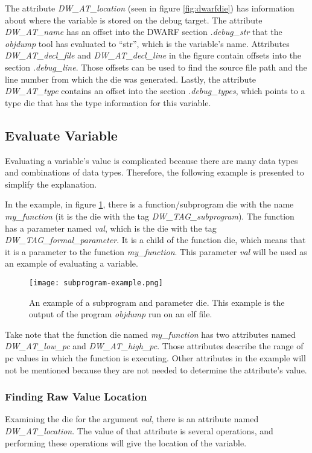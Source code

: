 The attribute \emph{DW\_AT\_location} (seen in figure \ref{fig:dwarfdie}) has information about where the variable is stored on the debug target.
The attribute \emph{DW\_AT\_name} has an offset into the \gls{DWARF} section \emph{.debug\_str} that the \emph{objdump} tool has evaluated to ``str'', which is the variable's name.
Attributes \emph{DW\_AT\_decl\_file} and \emph{DW\_AT\_decl\_line} in the figure contain offsets into the section \emph{.debug\_line}.
Those offsets can be used to find the source file path and the line number from which the \gls{die} was generated.
Lastly, the attribute \emph{DW\_AT\_type} contains an offset into the section \emph{.debug\_types}, which points to a type \gls{die} that has the type information for this variable.


\subsection{Evaluate Variable}
\label{sec:evaluate-variable}
Evaluating a variable's value is complicated because there are many data types and combinations of data types.
Therefore, the following example is presented to simplify the explanation.


In the example, in figure \ref{fig:subprogramexample}, there is a function/subprogram \gls{die} with the name \emph{my\_function} (it is the \gls{die} with the tag \emph{DW\_TAG\_subprogram}).
The function has a parameter named \emph{val}, which is the \gls{die} with the tag \emph{DW\_TAG\_formal\_parameter}.
It is a child of the function \gls{die}, which means that it is a parameter to the function \emph{my\_function}.
This parameter \emph{val} will be used as an example of evaluating a variable.


\begin{figure}[h]
	\centering
	\texttt{[image: subprogram-example.png]}
	\caption{An example of a subprogram and parameter \gls{die}. This example is the output of the program \emph{objdump} run on an \gls{elf} file.}
	\label{fig:subprogramexample}
\end{figure}


Take note that the function \gls{die} named \emph{my\_function} has two attributes named \emph{DW\_AT\_low\_pc} and \emph{DW\_AT\_high\_pc}.
Those attributes describe the range of \gls{pc} values in which the function is executing.
Other attributes in the example will not be mentioned because they are not needed to determine the attribute's value.


\subsubsection{Finding Raw Value Location}
Examining the \gls{die} for the argument \emph{val}, there is an attribute named \emph{DW\_AT\_location}.
The value of that attribute is several operations, and performing these operations will give the location of the variable.


